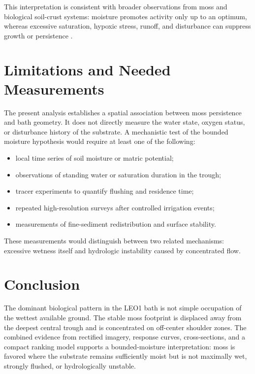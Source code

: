 \documentclass[11pt,a4paper]{article}
\begin{document}
This interpretation is consistent with broader observations from moss and
biological soil-crust systems: moisture promotes activity only up to an optimum,
whereas excessive saturation, hypoxic stress, runoff, and disturbance can
suppress growth or persistence \cite{Liu2026,Bartels2018,Macek2022,Szyja2023,Review2023}.

\section{Limitations and Needed Measurements}

The present analysis establishes a spatial association between moss persistence
and bath geometry. It does not directly measure the water state, oxygen status,
or disturbance history of the substrate. A mechanistic test of the bounded
moisture hypothesis would require at least one of the following:
\begin{itemize}[leftmargin=1.5em]
  \item local time series of soil moisture or matric potential;
  \item observations of standing water or saturation duration in the trough;
  \item tracer experiments to quantify flushing and residence time;
  \item repeated high-resolution surveys after controlled irrigation events;
  \item measurements of fine-sediment redistribution and surface stability.
\end{itemize}

These measurements would distinguish between two related mechanisms: excessive
wetness itself and hydrologic instability caused by concentrated flow.

\section{Conclusion}

The dominant biological pattern in the LEO1 bath is not simple occupation of
the wettest available ground. The stable moss footprint is displaced away from
the deepest central trough and is concentrated on off-center shoulder zones.
The combined evidence from rectified imagery, response curves, cross-sections,
and a compact ranking model supports a bounded-moisture interpretation: moss is
favored where the substrate remains sufficiently moist but is not maximally wet,
strongly flushed, or hydrologically unstable.
\end{document}
